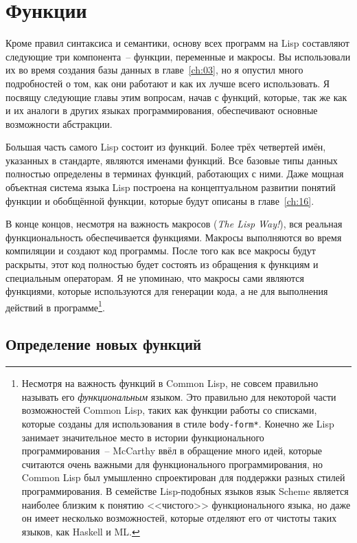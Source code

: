 \chapter{Функции}
\label{ch:05}

\thispagestyle{empty}

Кроме правил синтаксиса и семантики, основу всех программ на Lisp составляют следующие три
компонента~-- функции, переменные и макросы.  Вы использовали их во время создания базы
данных в главе~\ref{ch:03}, но я опустил много подробностей о том, как они работают и как
их лучше всего использовать.  Я посвящу следующие главы этим вопросам, начав с функций,
которые, так же как и их аналоги в других языках программирования, обеспечивают основные
возможности абстракции.

Большая часть самого Lisp состоит из функций.  Более трёх четвертей имён, указанных в
стандарте, являются именами функций.  Все базовые типы данных полностью определены в
терминах функций, работающих с ними. Даже мощная объектная система языка Lisp построена на
концептуальном развитии понятий функции и обобщённой функции, которые будут описаны в
главе~\ref{ch:16}.

В конце концов, несмотря на важность макросов (\textit{The Lisp Way!}), вся реальная
функциональность обеспечивается функциями.  Макросы выполняются во время компиляции и
создают код программы. После того как все макросы будут раскрыты, этот код полностью будет
состоять из обращения к функциям и специальным операторам.  Я не упоминаю, что макросы
сами являются функциями, которые используются для генерации кода, а не для выполнения
действий в программе\footnote{Несмотря на важность функций в Common Lisp, не совсем
  правильно называть его \emph{функциональным} языком.  Это правильно для некоторой части
  возможностей Common Lisp, таких как функции работы со списками, которые созданы для
  использования в стиле \texttt{body-form*}.  Конечно же Lisp занимает значительное место
  в истории функционального программирования~-- McCarthy ввёл в обращение много идей,
  которые считаются очень важными для функционального программирования, но Common Lisp был
  умышленно спроектирован для поддержки разных стилей программирования.  В семействе
  Lisp-подобных языков язык Scheme является наиболее близким к понятию <<чистого>>
  функционального языка, но даже он имеет несколько возможностей, которые отделяют его от
  чистоты таких языков, как Haskell и ML.}.

\section{Определение новых функций}


